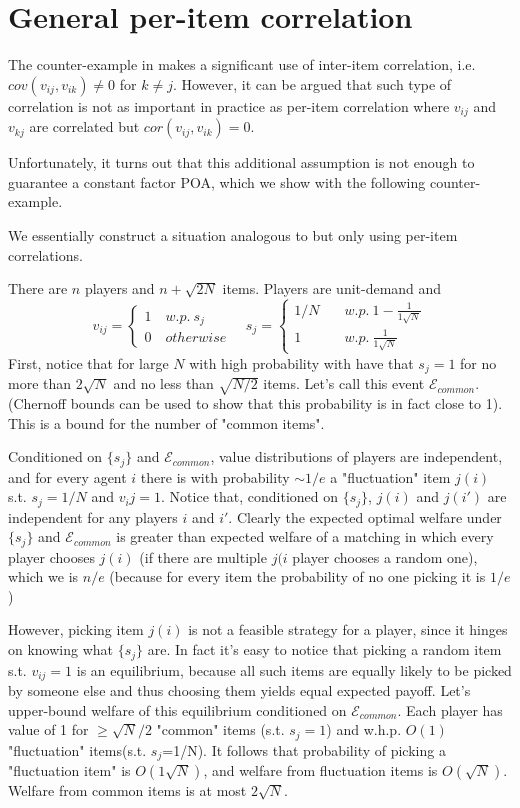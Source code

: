 \section{General per-item correlation}

The counter-example in \cite{roughgarden} makes a significant use of inter-item correlation, i.e. $cov(v_{ij},v_{ik})\neq 0$ for $k\neq j$. However, it can be argued that such type of correlation is not as important in practice as per-item correlation where $v_{ij}$ and $v_{kj}$ are correlated but $cor(v_{ij},v_{ik}) = 0$. 


Unfortunately, it turns out that this additional assumption is not enough to guarantee a constant factor POA, which we show with the following counter-example.

\begin{example}
We essentially construct a situation analogous to \cite{roughgarden} but only using per-item correlations.

There are $n$ players and $n+\sqrt{2N}$ items. Players are unit-demand and 
$$v_{ij} =\begin{cases} 
1\quad w.p.\ s_j\\
0\quad otherwise
\end{cases}
\quad
s_j = \begin{cases}
1/N \quad &w.p.\ 1-\frac{1}{1\sqrt{N}}\\
1 \quad &w.p.\ \frac{1}{1\sqrt{N}}
\end{cases}
$$
First, notice that for large $N$ with high probability with have that $s_j=1$ for no more than $2\sqrt{N}$ and no less than $\sqrt{N/2}$ items. Let's call this event $\mathcal{E}_{common}$. (Chernoff bounds can be used to show that this probability is in fact close to 1). This is a bound for the number of "common items".

Conditioned on $\{s_j\}$ and $\mathcal{E}_{common}$, value distributions of players are independent, and for every agent $i$ there is with probability $\sim 1/e$ a "fluctuation" item $j(i)$ s.t. $s_j=1/N$ and $v_ij = 1$. Notice that, conditioned on $\{s_j\}$, $j(i)$ and $j(i')$ are independent for any players $i$ and $i'$. Clearly the expected optimal welfare under $\{s_j\}$ and $\mathcal{E}_{common}$ is greater than expected welfare of a matching in which every player chooses $j(i)$ (if there are multiple $j(i$ player chooses a random one), which we is $n/e$ (because for every item the probability of no one picking it is $1/e$)

However, picking item $j(i)$ is not a feasible strategy for a player, since it hinges on knowing what $\{s_j\}$ are. In fact it's easy to notice that picking a random item s.t. $v_{ij}=1$ is an equilibrium, because all such items are equally likely to be picked by someone else and thus choosing them yields equal expected payoff. Let's upper-bound welfare of this equilibrium conditioned on $\mathcal{E}_{common}$. Each player has value of 1 for $\geq\sqrt{N}/2$  "common" items (s.t. $s_j=1$) and w.h.p. $O(1)$ "fluctuation" items(s.t. $s_j$=1/N). It follows that probability of picking a "fluctuation item" is $O(1\sqrt{N})$, and welfare from fluctuation items is $O(\sqrt{N})$. Welfare from common items is at most $2\sqrt{N}$.


\end{example}
